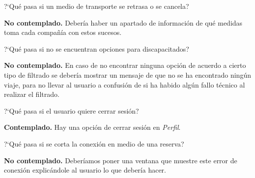 \begin{escenario} %
    \centering
?`Qué pasa si un medio de transporte se retrasa o se cancela?

\begin{solucion}
    \centering
    \textbf{No contemplado.} Debería haber un apartado de información de qué medidas toma cada compañía con estos sucesos.
\end{solucion}
\end{escenario}

\begin{escenario} %
    \centering
?`Qué pasa si no se encuentran opciones para discapacitados?

\begin{solucion}
    \centering
    \textbf{No contemplado.} En caso de no encontrar ninguna opción de acuerdo a cierto tipo de
        filtrado se debería mostrar un mensaje de que no se ha encontrado ningún viaje, para no
        llevar al usuario a confusión de si ha habido algún fallo técnico al realizar el filtrado.
\end{solucion}
\end{escenario}

\begin{escenario} %
    \centering
?`Qué pasa si el usuario quiere cerrar sesión?

\begin{solucion}
    \centering
    \textbf{Contemplado.} Hay una opción de cerrar sesión en \textit{Perfil}.
\end{solucion}
\end{escenario}

\begin{escenario} %
    \centering
?`Qué pasa si se corta la conexión en medio de una reserva?

\begin{solucion}
    \centering
    \textbf{No contemplado.} Deberíamos poner una ventana que muestre este error de conexión explicándole al usuario lo que debería hacer.
\end{solucion}
\end{escenario}